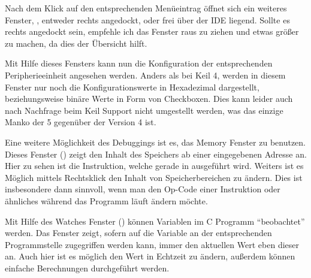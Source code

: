 
Nach dem Klick auf den entsprechenden Menüeintrag öffnet sich ein weiteres Fenster, , entweder rechts angedockt, oder frei über der IDE liegend. Sollte es rechts angedockt sein, empfehle ich das Fenster raus zu ziehen und etwas größer zu machen, da dies der Übersicht hilft.


Mit Hilfe dieses Fensters kann nun die Konfiguration der entsprechenden Peripherieeinheit angesehen werden. Anders als bei \gls{Keil} \uVision{} 4, werden in diesem Fenster nur noch die Konfigurationswerte in Hexadezimal dargestellt, beziehungsweise binäre Werte in Form von Checkboxen. Dies kann leider auch nach Nachfrage beim \gls{Keil} Support nicht umgestellt werden, was das einzige Manko der \uVision{} 5 gegenüber der Version 4 ist.


Eine weitere Möglichkeit des Debuggings ist es, das Memory Fenster zu benutzen. Dieses Fenster () zeigt den Inhalt des Speichers ab einer eingegebenen Adresse an. Hier zu sehen ist die Instruktion, welche gerade in  ausgeführt wird. Weiters ist es Möglich mittels Rechtsklick den Inhalt von Speicherbereichen zu ändern. Dies ist insbesondere dann sinnvoll, wenn man den Op-Code einer Instruktion oder ähnliches während das Programm läuft ändern möchte.


Mit Hilfe des Watches Fenster () können Variablen im \gls{C} Programm \enquote{beobachtet} werden. Das Fenster zeigt, sofern auf die Variable an der entsprechenden Programmstelle zugegriffen werden kann, immer den aktuellen Wert eben dieser an. Auch hier ist es möglich den Wert in Echtzeit zu ändern, außerdem können einfache Berechnungen durchgeführt werden.


